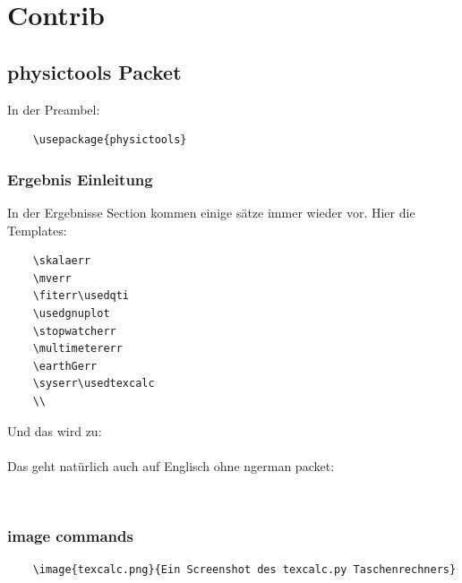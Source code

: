 \documentclass[a4paper]{article}
\begin{document}
\section{Contrib}



\subsection{physictools Packet}

In der Preambel:

\begin{verbatim}
	\usepackage{physictools}
\end{verbatim}

\subsubsection{Ergebnis Einleitung}

In der Ergebnisse Section kommen einige sätze immer wieder vor. Hier die Templates:

\begin{verbatim}
	\skalaerr
	\mverr
	\fiterr\usedqti
	\usedgnuplot
	\stopwatcherr
	\multimetererr
	\earthGerr
	\syserr\usedtexcalc
	\\
\end{verbatim}


Und das wird zu: \\

\skalaerr
\mverr
\fiterr\usedqti
\usedgnuplot
\stopwatcherr
\multimetererr
\earthGerr
\syserr\usedtexcalc
\\

Das geht natürlich auch auf Englisch ohne ngerman packet: \\


\skalaerr
\mverr
\fiterr\usedqti
\usedgnuplot
\stopwatcherr
\multimetererr
\earthGerr
\syserr\usedtexcalc
\\


\subsubsection{image commands}

\begin{verbatim}
	\image{texcalc.png}{Ein Screenshot des texcalc.py Taschenrechners}
\end{verbatim}
\end{document}
